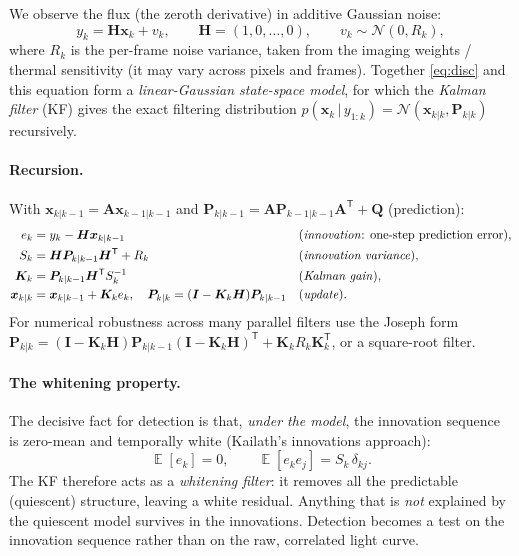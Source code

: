 \documentclass[11pt]{article}
\DeclareMathOperator{\E}{\mathbb{E}}
\newcommand{\Norm}{\mathcal{N}}
\newcommand{\T}{^{\mathsf{T}}}
\newcommand{\given}{\,|\,}
\begin{document}
We observe the flux (the zeroth derivative) in additive Gaussian noise:
\begin{equation}
  y_k = \bm{H}\bm{x}_k + v_k, \qquad \bm{H}=(1,0,\dots,0),\qquad v_k\sim\Norm(0,R_k),
\end{equation}
where $R_k$ is the per-frame noise variance, taken from the imaging weights / thermal
sensitivity (it may vary across pixels and frames). Together
\eqref{eq:disc} and this equation form a \emph{linear-Gaussian state-space model}, for
which the \emph{Kalman filter} (KF) gives the exact filtering distribution
$p(\bm{x}_k\given y_{1:k})=\Norm(\bm{x}_{k|k},\bm{P}_{k|k})$ recursively.

\paragraph{Recursion.} With $\bm{x}_{k|k-1}=\bm{A}\bm{x}_{k-1|k-1}$ and
$\bm{P}_{k|k-1}=\bm{A}\bm{P}_{k-1|k-1}\bm{A}\T+\bm{Q}$ (prediction):
\begin{align}
  e_k &= y_k - \bm{H}\bm{x}_{k|k-1}
      &&\text{(\emph{innovation}: one-step prediction error)},\\
  S_k &= \bm{H}\bm{P}_{k|k-1}\bm{H}\T + R_k
      &&\text{(\emph{innovation variance})},\\
  \bm{K}_k &= \bm{P}_{k|k-1}\bm{H}\T S_k^{-1}
      &&\text{(\emph{Kalman gain})},\\
  \bm{x}_{k|k} &= \bm{x}_{k|k-1} + \bm{K}_k e_k, \quad
  \bm{P}_{k|k} = (\bm{I}-\bm{K}_k\bm{H})\bm{P}_{k|k-1}
      &&\text{(\emph{update})}.
\end{align}
For numerical robustness across many parallel filters use the Joseph form
$\bm{P}_{k|k}=(\bm{I}-\bm{K}_k\bm{H})\bm{P}_{k|k-1}(\bm{I}-\bm{K}_k\bm{H})\T+\bm{K}_k R_k\bm{K}_k\T$,
or a square-root filter.

\paragraph{The whitening property.}
The decisive fact for detection is that, \emph{under the model}, the innovation
sequence is zero-mean and temporally white (Kailath's innovations approach):
\begin{equation}
  \E[e_k]=0,\qquad \E[e_k e_j] = S_k\,\delta_{kj}.
  \label{eq:white}
\end{equation}
The KF therefore acts as a \emph{whitening filter}: it removes all the predictable
(quiescent) structure, leaving a white residual. Anything that is \emph{not} explained
by the quiescent model survives in the innovations. Detection becomes a test on the
innovation sequence rather than on the raw, correlated light curve.
\end{document}
